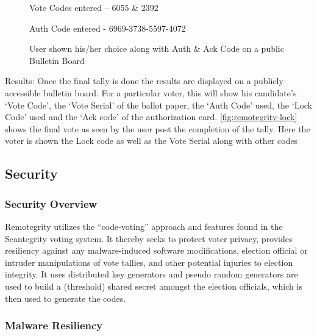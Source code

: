 \begin{figure}
  \centering {}
  \caption{Vote Codes entered -- 6055 \& 2392}
  \label{fig:remotegrity-vote-code}
\end{figure}

\begin{figure}
  \centering {}
  \caption{Auth Code entered - 6969-3738-5597-4072}
  \label{fig:remotegrity-auth-code}
\end{figure}

\begin{figure}
  \centering {}
  \caption{User shown his/her choice along with Auth \& Ack Code on a
    public Bulletin Board}
  \label{fig:remotegrity-bb}
\end{figure}

Results: Once the final tally is done the results are displayed on a
publicly accessible bulletin board. For a particular voter, this will
show his candidate's `Vote Code', the `Vote Serial' of the ballot
paper, the `Auth Code' used, the `Lock Code' used and the `Ack code'
of the authorization card. \autoref{fig:remotegrity-lock} shows the
final vote as seen by the user post the completion of the tally. Here
the voter is shown the Lock code as well as the Vote Serial along with
other codes

\subsection{Security}

\subsubsection{Security Overview}

Remotegrity utilizes the ``code-voting'' approach and features found
in the Scantegrity voting system. It thereby seeks to protect voter
privacy, provides resiliency against any malware-induced software
modifications, election official or intruder manipulations of vote
tallies, and other potential injuries to election integrity. It uses
distributed key generators and pseudo random generators are used to
build a (threshold) shared secret amongst the election officials,
which is then used to generate the codes.

\subsubsection{Malware Resiliency}

